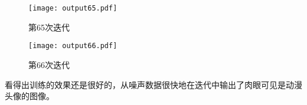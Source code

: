 \documentclass[a4paper,AutoFakeBold,AutoFakeSlant]{ctexart}
\begin{document}
\begin{figure}[H]
  \centering
  \begin{minipage}[t]{0.48\textwidth}
  \centering
  \texttt{[image: output65.pdf]}
  \caption{第65次迭代}
  \end{minipage}
  \begin{minipage}[t]{0.48\textwidth}
  \centering
  \texttt{[image: output66.pdf]}
  \caption{第66次迭代}
  \end{minipage}
\end{figure}

看得出训练的效果还是很好的，从噪声数据很快地在迭代中输出了肉眼可见是动漫头像的图像。




% 

\end{document}
